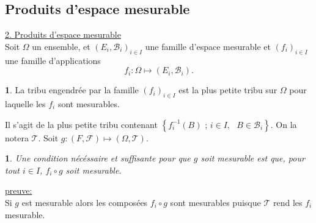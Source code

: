 \documentclass[8pt,notheorems]{beamer}
\newtheorem{theorem}{\translate{Theorem}}[section]
\newtheorem{theorem}{\translate{Theoreme}}
\theoremstyle{definition}
\newtheorem{definition}{\translate{Definition}}
\theoremstyle{example}
\theoremstyle{mystyle}
\theoremstyle{plain}
\begin{document}
\subsection{Produits d'espace mesurable}
\begin{frame}[allowframebreaks]
\underline{2. Produits d'espace mesurable}\\
Soit $\Omega$ un ensemble, et $(E_i,\mathcal{B}_i)_{i\in I}$ une famille d'espace mesurable et $(f_i)_{i\in I}$ une famille d'applications
$$
f_i:\Omega \mapsto (E_i,\mathcal{B}_i). 
$$ 
\begin{definition}
La tribu engendrée par la famille $(f_i)_{i\in I}$ est la plus petite tribu sur $\Omega$ pour laquelle les $f_i$ sont mesurables. 
\end{definition}
Il s'agit de la plus petite tribu contenant $\left\{f_i^{-1}(B)\text{ ; }i\in I,\text{ }B\in\mathcal{B}_i\right\}$. On la notera $\mathcal{T}$. Soit $g:(F,\mathcal{F})\mapsto(\Omega,\mathcal{T}) $.\\
\begin{theorem}
Une condition nécéssaire et suffisante pour que $g$ soit mesurable est que, pour tout $i\in I$, $f_i\circ g$ soit mesurable. 
\end{theorem}
\underline{preuve:}\\
Si $g$ est mesurable alors les composées $f_i\circ g$ sont mesurables puisque $\mathcal{T}$ rend les $f_i$ mesurable. \\


\end{frame}
\end{document}
